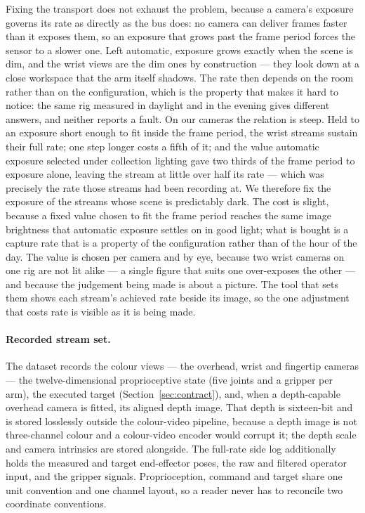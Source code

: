 Fixing the transport does not exhaust the problem, because a camera's exposure
governs its rate as directly as the bus does: no camera can deliver frames
faster than it exposes them, so an exposure that grows past the frame period
forces the sensor to a slower one. Left automatic, exposure grows exactly when
the scene is dim, and the wrist views are the dim ones by construction --- they
look down at a close workspace that the arm itself shadows. The rate then
depends on the room rather than on the configuration, which is the property that
makes it hard to notice: the same rig measured in daylight and in the evening
gives different answers, and neither reports a fault. On our cameras the
relation is steep. Held to an exposure short enough to fit inside the frame
period, the wrist streams sustain their full rate; one step longer costs a fifth
of it; and the value automatic exposure selected under collection lighting gave
two thirds of the frame period to exposure alone, leaving the stream at little
over half its rate --- which was precisely the rate those streams had been
recording at. We therefore fix the exposure of the streams whose scene is
predictably dark. The cost is slight, because a fixed value chosen to fit the
frame period reaches the same image brightness that automatic exposure settles
on in good light; what is bought is a capture rate that is a property of the
configuration rather than of the hour of the day. The value is chosen per camera
and by eye, because two wrist cameras on one rig are not lit alike --- a single
figure that suits one over-exposes the other --- and because the judgement being
made is about a picture. The tool that sets them shows each stream's achieved
rate beside its image, so the one adjustment that costs rate is visible as it is
being made.

\paragraph{Recorded stream set.} The dataset records the colour views --- the
overhead, wrist and fingertip cameras --- the twelve-dimensional
proprioceptive state (five joints and a gripper per arm), the executed target
(Section~\ref{sec:contract}), and, when a depth-capable overhead camera is
fitted, its aligned depth image. That depth is sixteen-bit and is stored
losslessly outside the colour-video pipeline, because a depth image is not
three-channel colour and a colour-video encoder would corrupt it; the depth
scale and camera intrinsics are stored alongside. The full-rate side log
additionally holds the measured and target end-effector poses, the raw and
filtered operator input, and the gripper signals. Proprioception, command
and target share one unit convention and one channel layout, so a reader
never has to reconcile two coordinate conventions.

